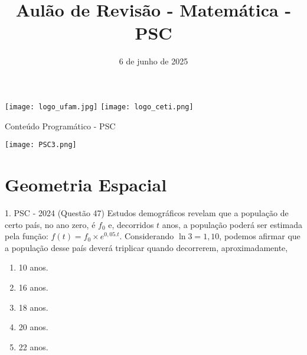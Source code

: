 \documentclass[aspectratio=169]{beamer}
\title[CETi Gilberto Mestrinho]{Aulão de Revisão - Matemática - PSC}
\date{6 de junho de 2025}
\newif\ifusarcorvermelha
\newcommand{\vermelho}[1]{%
    \ifusarcorvermelha
        {\color{red}#1}%
    \else
        #1%
    \fi
}
\begin{document}
\justifying
\onehalfspacing

\begin{frame}
    \begin{titlepage}
    \centering
    \vspace*{1cm} %
    
    \noindent%
    \hspace*{0.3\paperwidth}%
    \texttt{[image: logo\_ufam.jpg]}%
    \hfill%
    \texttt{[image: logo\_ceti.png]}%
    \hspace*{0.3\paperwidth}%
    
    \vspace{0.1cm} %

    \vspace{1cm}
    
    \vfill %
    \end{titlepage}
\end{frame}

\begin{frame}{Conteúdo Programático - PSC}

    \begin{center}
        \texttt{[image: PSC3.png]}
    \end{center}
    
\end{frame}

\section{Geometria Espacial}

    \begin{frame}{1. PSC  - 2024 (Questão 47)}
        Estudos demográficos revelam que a população de certo país, no ano zero, é $f_{0}$ e, decorridos $t$ anos, a população poderá ser estimada pela função: $f(t)=f_{0} \times  e^{0,05 . t}$. Considerando $\ln{3}=1,10$, podemos afirmar que a população desse país deverá triplicar quando decorrerem, aproximadamente,

            \begin{enumerate}[a]
                \item 10 anos.
                \item 16 anos.
                \item 18 anos.
                \item 20 anos.
                \item \vermelho{22 anos.} %
            \end{enumerate}
            
    \end{frame}
\end{document}
